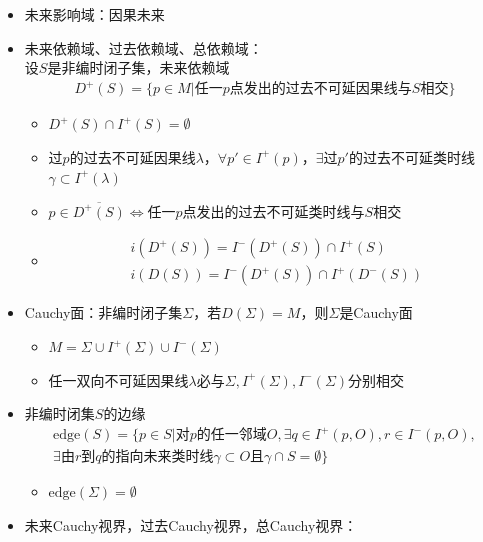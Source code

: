 \begin{itemize}
\begin{itemize}
\begin{gather*}
        \end{gather*}
    \end{itemize}
    \item 未来影响域：因果未来
    \item 未来依赖域、过去依赖域、总依赖域：\\
    设$S$是非编时闭子集，未来依赖域
    \begin{gather*}
        D^+(S) = \{p \in M | \text{任一$p$点发出的过去不可延因果线与$S$相交}\}
    \end{gather*}
    \begin{itemize}
        \item $D^+(S) \cap I^+(S) = \emptyset$
        \item 过$p$的过去不可延因果线$\lambda$，$\forall p' \in I^+(p)$，$\exists$过$p'$的过去不可延类时线$\gamma \subset I^+(\lambda)$
        \item $p \in \overline{D^+(S)} \iff$任一$p$点发出的过去不可延类时线与$S$相交
        \item \begin{gather*}
            i(D^+(S))=I^-(D^+(S)) \cap I^+(S)
            \\
            i(D(S))=I^-(D^+(S)) \cap I^+(D^-(S))
        \end{gather*}
    \end{itemize}
    \item Cauchy面：非编时闭子集$\Sigma$，若$D(\Sigma)=M$，则$\Sigma$是Cauchy面
    \begin{itemize}
        \item $M=\Sigma \cup I^+(\Sigma) \cup I^-(\Sigma)$
        \item 任一双向不可延因果线$\lambda$必与$\Sigma, I^+(\Sigma), I^-(\Sigma)$分别相交
    \end{itemize}
    \item 非编时闭集$S$的边缘
    \begin{gather*}
        \textrm{edge}(S)=\{p \in S \vert \text{对}p\text{的任一邻域}O, \exists q \in I^+(p, O), r \in I^-(p, O), 
        \\
        \exists\text{由}r\text{到}q\text{的指向未来类时线}\gamma \subset O \text{且} \gamma \cap S = \emptyset\}
    \end{gather*}
    \begin{itemize}
        \item $\textrm{edge}(\Sigma)=\emptyset$
    \end{itemize}
    \item 未来Cauchy视界，过去Cauchy视界，总Cauchy视界：\\

\end{itemize}
